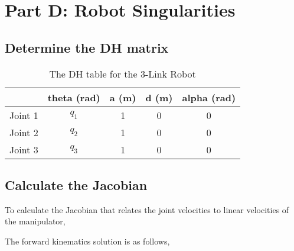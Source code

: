 \section{Part D: Robot Singularities}
\subsection{Determine the DH matrix}
\begin{table}[H]
    \centering
    \begin{tabular}{|c|c|c|c|c|}
        \hline
                & \textbf{theta (rad)} & \textbf{a (m)} & \textbf{d (m)} & \textbf{alpha (rad)} \\ \hline
        Joint 1 & $q_{1}$              & 1              & 0              & 0                    \\ \hline
        Joint 2 & $q_{2}$              & 1              & 0              & 0                    \\ \hline
        Joint 3 & $q_{3}$              & 1              & 0              & 0                    \\ \hline
    \end{tabular}
    \caption{The DH table for the 3-Link Robot}
    \label{table:3-Link Robot}
\end{table}
\subsection{Calculate the Jacobian}

To calculate the Jacobian that relates the joint velocities to linear velocities of the manipulator,


The forward kinematics solution is as follows,

